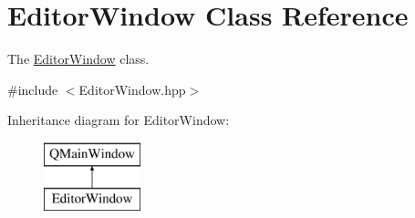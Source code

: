 \hypertarget{classEditorWindow}{\section{Editor\+Window Class Reference}
\label{classEditorWindow}
}


The \hyperlink{classEditorWindow}{Editor\+Window} class.  




{\ttfamily \#include $<$Editor\+Window.\+hpp$>$}

Inheritance diagram for Editor\+Window\+:\begin{figure}[H]
\begin{center}
\leavevmode
\includegraphics[height=2.000000cm]{classEditorWindow}
\end{center}
\end{figure}
